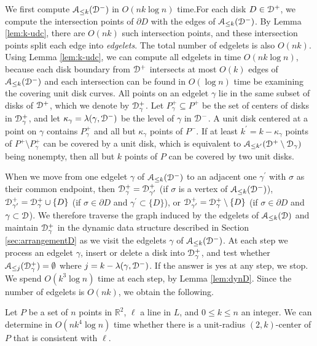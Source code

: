 \documentclass[11pt]{myclass}
\renewcommand{\b}[1]{\ensuremath{\mathbb{#1}}}
\newcommand{\EuD}{\ensuremath{\EuScript{D}}}
\newcommand{\EuA}{\ensuremath{\EuScript{A}}}
\begin{document}
We first compute $\EuA_{\leq k}(\EuD^-)$ in $O(n k \log n)$ time.For each disk $D \in \EuD^+$, we compute the intersection points of $\partial D$ with the edges of $\EuA_{\leq k}(\EuD^-)$.  By Lemma \ref{lem:k-udc}, there are $O(nk)$ such intersection points, and these intersection points split each edge into \emph{edgelets}.  The total number of edgelets is also $O(nk)$.  
Using Lemma \ref{lem:k-udc}, we can compute all edgelets in time $O(nk\log n)$, because each disk boundary from $\EuD^+$ intersects at most $O(k)$ edges of $\EuA_{\leq k}(\EuD^-)$ and each intersection can be found in $O(\log n)$ time be examining the covering unit disk curves.
All points on an edgelet $\gamma$ lie in the same subset of disks of $\EuD^+$, which we denote by $\EuD^+_{\gamma}$.  Let $P^+_{\gamma} \subseteq P^+$ be the set of centers of disks in $\EuD^+_{\gamma}$, and let $\kappa_{\gamma} = \lambda(\gamma, \EuD^-)$ be the level of $\gamma$ in $\EuD^-$.  A unit disk centered at a point on $\gamma$ contains $P^+_{\gamma}$ and all but $\kappa_{\gamma}$ points of $P^-$.  If at least $k^\prime = k-\kappa_\gamma$ points of $P^+ \setminus P_{\gamma}^+$ can be covered by a unit disk, which is equivalent to $\EuA_{\leq k^{\prime}}(\EuD^+ \setminus \EuD_{\gamma})$ being nonempty, then all but $k$ points of $P$ can be covered by two unit disks.  

When we move from one edgelet $\gamma$ of $\EuA_{\leq k}(\EuD^-)$ to an adjacent one $\gamma^\prime$ with $\sigma$ as their common endpoint, then $\EuD^+_{\gamma} = \EuD^+_{\gamma^\prime}$ (if $\sigma$ is a vertex of $\EuA_{\leq k}(\EuD^-)$), $\EuD^+_{\gamma^\prime} = \EuD^+_{\gamma} \cup \{ D\}$ (if $\sigma \in \partial D$ and $\gamma^\prime \subset \{ D \}$), or $\EuD^+_{\gamma^\prime} = \EuD^+_{\gamma} \setminus \{D\}$ (if $\sigma \in \partial D$ and $\gamma \subset \EuD$).  
We therefore traverse the graph induced by the edgelets of $\EuA_{\leq k}(\EuD)$ and maintain $\EuD_{\gamma}^+$ in the dynamic  data structure described  in Section \ref{sec:arrangementD} as we visit the edgelets $\gamma$ of $\EuA_{\leq k}(\EuD^-)$.  At each step we process an edgelet $\gamma$, insert or delete a disk into $\EuD_{\gamma}^+$, and test whether $\EuA_{\leq j}(\EuD_{\gamma}^+) = \emptyset$ where $j = k - \lambda(\gamma, \EuD^-)$.  If the answer is yes at any step, we stop.  We spend $O(k^3 \log n)$ time at each step, by Lemma \ref{lem:dynD}.  Since the number of edgelets is $O(nk)$, we obtain the following.

\begin{lemma}
Let $P$ be a set of $n$ points in $\b{R}^2$, $\ell$ a line in $L$,  and $0 \leq k \leq n$ an integer.  
We can determine in $O(nk^4 \log n)$ time whether 
there is a unit-radius $(2,k)$-center of $P$ that is consistent with $\ell$.
\end{lemma}
\end{document}
